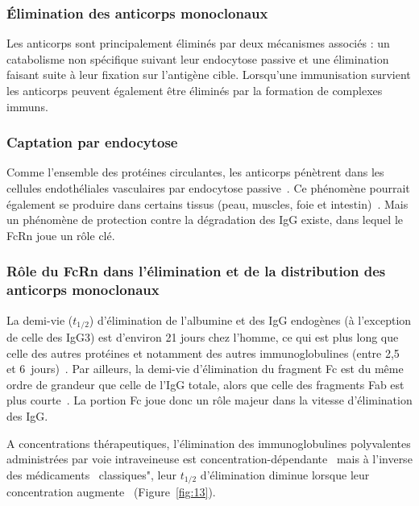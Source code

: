 \subsubsection{Élimination des anticorps monoclonaux}
Les anticorps sont principalement éliminés par deux mécanismes associés : un catabolisme non spécifique suivant leur endocytose passive et une élimination faisant suite à leur fixation sur l'antigène cible. Lorsqu'une immunisation survient les anticorps peuvent également être éliminés par la formation de complexes immuns.

\subsubsection{Captation par endocytose}
Comme l'ensemble des protéines circulantes, les anticorps pénètrent dans les cellules endothéliales vasculaires par endocytose passive~\citep{REF7, REF18}. Ce phénomène pourrait également se produire dans certains tissus (peau, muscles, foie et intestin)~\citep{REF19}. Mais un phénomène de protection contre la dégradation des IgG existe, dans lequel le FcRn joue un rôle clé.

\subsubsection{Rôle du FcRn dans l'élimination et de la distribution des anticorps monoclonaux}
La demi-vie ($t_{1/2}$) d'élimination de l'albumine et des IgG endogènes (à l'exception de celle des IgG3) est d'environ 21 jours chez l'homme, ce qui est plus long que celle des autres protéines et notamment des autres immunoglobulines (entre 2,5 et 6~jours)~\citep{REF20, REF21}. Par ailleurs, la demi-vie d'élimination du fragment Fc est du même ordre de grandeur que celle de l'IgG totale, alors que celle des fragments Fab est plus courte~\citep{REF22}. La portion Fc joue donc un rôle majeur dans la vitesse d'élimination des IgG.

A concentrations thérapeutiques, l'élimination des immunoglobulines polyvalentes administrées par voie intraveineuse est concentration-dépendante~\citep{REF23} mais à l'inverse des médicaments \og~classiques", leur $t_{1/2}$ d'élimination diminue lorsque leur concentration augmente~\citep{REF20} (Figure~\ref{fig:13}).


